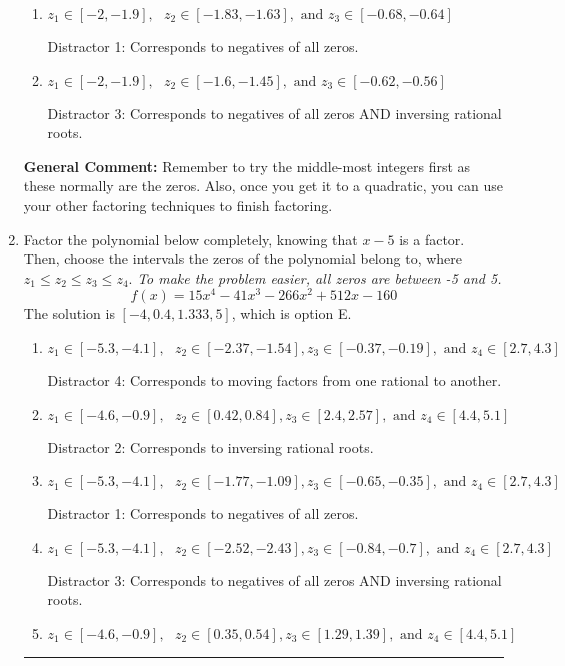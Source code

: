 \documentclass{extbook}[14pt]
\newcommand{\litem}[1]{\item #1

\rule{\textwidth}{0.4pt}}
\begin{document}
\begin{enumerate}
{\begin{enumerate}[label=\Alph*.]
 Distractor 2: Corresponds to inversing rational roots.
\item \( z_1 \in [-2, -1.9], \text{   }  z_2 \in [-1.83, -1.63], \text{   and   } z_3 \in [-0.68, -0.64] \)

 Distractor 1: Corresponds to negatives of all zeros.
\item \( z_1 \in [-2, -1.9], \text{   }  z_2 \in [-1.6, -1.45], \text{   and   } z_3 \in [-0.62, -0.56] \)

 Distractor 3: Corresponds to negatives of all zeros AND inversing rational roots.
\end{enumerate}

\textbf{General Comment:} Remember to try the middle-most integers first as these normally are the zeros. Also, once you get it to a quadratic, you can use your other factoring techniques to finish factoring.
}
\litem{
Factor the polynomial below completely, knowing that $x -5$ is a factor. Then, choose the intervals the zeros of the polynomial belong to, where $z_1 \leq z_2 \leq z_3 \leq z_4$. \textit{To make the problem easier, all zeros are between -5 and 5.}
\[ f(x) = 15x^{4} -41 x^{3} -266 x^{2} +512 x -160 \]The solution is \( [-4, 0.4, 1.333, 5] \), which is option E.\begin{enumerate}[label=\Alph*.]
\item \( z_1 \in [-5.3, -4.1], \text{   }  z_2 \in [-2.37, -1.54], z_3 \in [-0.37, -0.19], \text{   and   } z_4 \in [2.7, 4.3] \)

 Distractor 4: Corresponds to moving factors from one rational to another.
\item \( z_1 \in [-4.6, -0.9], \text{   }  z_2 \in [0.42, 0.84], z_3 \in [2.4, 2.57], \text{   and   } z_4 \in [4.4, 5.1] \)

 Distractor 2: Corresponds to inversing rational roots.
\item \( z_1 \in [-5.3, -4.1], \text{   }  z_2 \in [-1.77, -1.09], z_3 \in [-0.65, -0.35], \text{   and   } z_4 \in [2.7, 4.3] \)

 Distractor 1: Corresponds to negatives of all zeros.
\item \( z_1 \in [-5.3, -4.1], \text{   }  z_2 \in [-2.52, -2.43], z_3 \in [-0.84, -0.7], \text{   and   } z_4 \in [2.7, 4.3] \)

 Distractor 3: Corresponds to negatives of all zeros AND inversing rational roots.
\item \( z_1 \in [-4.6, -0.9], \text{   }  z_2 \in [0.35, 0.54], z_3 \in [1.29, 1.39], \text{   and   } z_4 \in [4.4, 5.1] \)


\end{enumerate}}
\end{enumerate}
\end{document}

